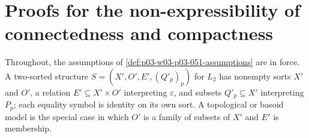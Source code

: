 \section{Proofs for the non-expressibility of connectedness and compactness}
\label{sec:annex-p03-w03-p03-051-nondefinability}

Throughout, the assumptions of \cref{def:p03-w03-p03-051-assumptions} are in
force. A two-sorted structure \(S=(X',O',E',(Q'_p)_p)\) for \(L_2\) has
nonempty sorts \(X'\) and \(O'\), a relation \(E'\subseteq X'\times O'\)
interpreting \(\varepsilon\), and subsets \(Q'_p\subseteq X'\)
interpreting \(P_p\); each equality symbol is identity on its own sort.
A topological or basoid model is the special case in which \(O'\) is a
family of subsets of \(X'\) and \(E'\) is membership.

